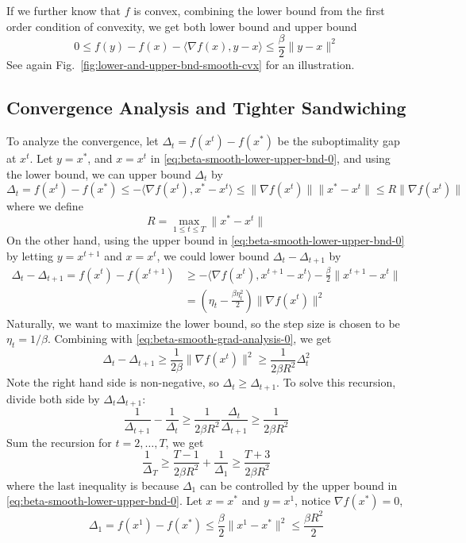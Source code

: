 \documentclass{scrartcl}
\begin{document}
If we further know that $f$ is convex, combining the lower bound from the first order condition of
convexity, we get both lower bound and upper bound
\begin{equation}
  0 \leq f(y) - f(x) - \langle \nabla f(x), y-x\rangle \leq \frac{\beta}{2}\|y-x\|^2
  \label{eq:beta-smooth-lower-upper-bnd-0}
\end{equation}
See again Fig.~\ref{fig:lower-and-upper-bnd-smooth-cvx} for an illustration.

\subsection{Convergence Analysis and Tighter Sandwiching}

To analyze the convergence, let $\Delta_t=f(x^t)-f(x^*)$ be the suboptimality gap at $x^t$. Let
$y=x^*$, and $x=x^t$ in \eqref{eq:beta-smooth-lower-upper-bnd-0}, and using the lower bound, we can
upper bound $\Delta_t$ by
\begin{equation}
  \Delta_t = f(x^t)-f(x^*) \leq -\langle \nabla f(x^t), x^*-x^t\rangle
  \leq \|\nabla f(x^t)\|\|x^*-x^t\| \leq R\|\nabla f(x^t)\|
  \label{eq:beta-smooth-grad-analysis-0}
\end{equation}
where we define
\begin{equation}
  R=\max_{1\leq t\leq T}\|x^*-x^t\|
\end{equation}
On the other hand, using the upper bound in \eqref{eq:beta-smooth-lower-upper-bnd-0} by letting
$y=x^{t+1}$ and $x=x^t$, we could lower bound $\Delta_t-\Delta_{t+1}$ by
\[
\begin{aligned}
  \Delta_t-\Delta_{t+1} = f(x^t)-f(x^{t+1})
  &\geq -\langle \nabla f(x^t), x^{t+1}-x^t\rangle - \frac{\beta}{2}\|x^{t+1}-x^t\| \\
  &= \left(\eta_t - \frac{\beta\eta_t^2}{2}\right) \|\nabla f(x^t)\|^2
\end{aligned}
\]
Naturally, we want to maximize the lower bound, so the step size is chosen to be
$\eta_t = 1/\beta$. Combining with \eqref{eq:beta-smooth-grad-analysis-0}, we get
\begin{equation}
   \Delta_t - \Delta_{t+1}\geq \frac{1}{2\beta}\|\nabla f(x^t)\|^2
   \geq \frac{1}{2\beta R^2}\Delta_t^2
 \end{equation}
 Note the right hand side is non-negative, so $\Delta_t\geq \Delta_{t+1}$. To solve this recursion,
 divide both side by $\Delta_t\Delta_{t+1}$:
 \begin{equation}
   \frac{1}{\Delta_{t+1}} - \frac{1}{\Delta_t} \geq \frac{1}{2\beta R^2}\frac{\Delta_t}{\Delta_
   {t+1}} \geq \frac{1}{2\beta R^2}
 \end{equation}
 Sum the recursion for $t=2,\ldots,T$, we get
 \[
 \frac{1}{\Delta}_T \geq \frac{T-1}{2\beta R^2} + \frac{1}{\Delta_1}
 \geq \frac{T+3}{2\beta R^2}
 \]
 where the last inequality is because $\Delta_1$ can be controlled by the upper bound in
 \eqref {eq:beta-smooth-lower-upper-bnd-0}. Let $x=x^*$ and $y=x^1$, notice $\nabla f(x^*)=0$,
 \[
 \Delta_1 = f(x^1)-f(x^*) \leq \frac{\beta}{2}\|x^1-x^*\|^2 \leq \frac{\beta R^2}{2}
 \]
\end{document}
